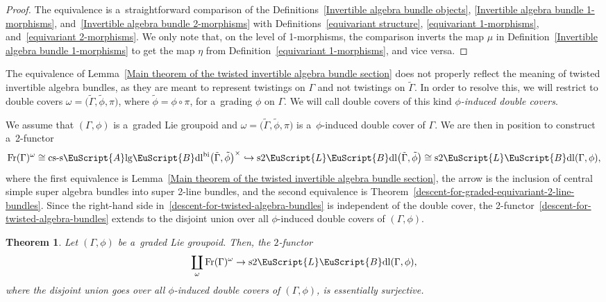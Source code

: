 \documentclass[10pt,a4paper]{amsart}
\numberwithin{equation}{section}
\newtheorem{Theorem}{Theorem}[section]
\def\mathscr#1{\EuScript{#1}}
\newcommand{\incl}{\hookrightarrow}
\newcommand{\LineBdl}{\mathscr{L}\mathscr{B}\mathrm{dl}}
\newcommand{\stwoLineBdl}{\mathrm{s}2\LineBdl}
\newcommand{\Alg}{\Incl\mathrm{lg}}
\newcommand{\cssAlg}{\mathrm{cs\text{-}s}\Alg}
\newcommand{\cssAlgBdlbi}{\cssAlg\mathscr{B}\mathrm{dl}^{\mathrm{bi}}}
\newcommand{\Incl}{\mathscr{A}}
\begin{document}
\begin{proof}
 The equivalence is a~straightforward comparison of the Definitions~\ref{Invertible algebra bundle objects},
 \ref{Invertible algebra bundle 1-morphisms}, and~\ref{Invertible algebra bundle 2-morphisms} with Definitions~\ref{equivariant structure}, \ref{equivariant 1-morphisms}, and~\ref{equivariant 2-morphisms}. We only note that, on the level of 1-morphisms,
 the comparison inverts the map $\mu$ in Definition~\ref{Invertible algebra bundle 1-morphisms} to get the map $\eta$
 from Definition~\ref{equivariant 1-morphisms}, and vice versa.
\end{proof}


The equivalence of Lemma~\ref{Main theorem of the twisted invertible algebra bundle section} does not properly reflect the meaning of twisted invertible algebra bundles, as they are meant to represent twistings on $\Gamma$ and not twistings on $\tilde\Gamma$.
In order to resolve this, we will restrict to double covers $\omega=\bigl(\tilde\Gamma,\tilde\phi,\pi\bigr)$, where $\tilde\phi=\phi \circ \pi$, for a~grading $\phi$ on $\Gamma$.
We will call double covers of this kind \emph{$\phi$-induced double covers}.

We assume that $(\Gamma,\phi)$ is a~graded Lie groupoid and $\omega=\bigl(\tilde\Gamma,\tilde\phi,\pi\bigr)$ is a~$\phi$-induced double cover of $\Gamma$. We are then in position to construct a~2-functor
\begin{equation}
\label{descent-for-twisted-algebra-bundles}
\mathrm{Fr}(\Gamma)^{\omega} \cong \cssAlgBdlbi\bigl(\tilde \Gamma,\tilde \phi\bigr)^\times \incl \stwoLineBdl\bigl(\tilde \Gamma,\tilde \phi\bigr) \cong \stwoLineBdl(\Gamma,\phi),
\end{equation}
where the first equivalence is Lemma~\ref{Main theorem of the twisted invertible algebra bundle section}, the arrow is the inclusion of central simple super algebra bundles into super 2-line bundles, and the second equivalence is Theorem~\ref{descent-for-graded-equivariant-2-line-bundles}.
Since the right-hand side in~\eqref{descent-for-twisted-algebra-bundles} is independent of the double cover, the 2-functor~\eqref{descent-for-twisted-algebra-bundles} extends to the disjoint union over all $\phi$-induced double covers of $(\Gamma,\phi)$.

\begin{Theorem}
\label{freeds-invertible-algebra-bundles-comparison}
Let $(\Gamma,\phi)$ be a~graded Lie groupoid. Then, the $2$-functor
\begin{equation*}
\coprod_{\omega}\mathrm{Fr}(\Gamma)^{\omega}\to \stwoLineBdl(\Gamma,\phi),
\end{equation*}
where the disjoint union goes over all $\phi$-induced double covers of $(\Gamma,\phi)$,
is essentially surjective.
\end{Theorem}
\end{document}
